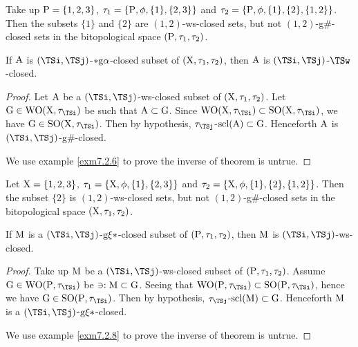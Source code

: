 \begin{exm}\label{exm7.2.4}
Take up $\mathrm{P}= \{1,2,3\}$, $\tau_1 =\{\mathrm{P}, \phi, \{1\}, \{2,3\}\}$ and $\tau_2 =\{\mathrm{P}, \phi, \{1\}, \{2\}, \{1,2\}\}$. Then the subsets $\{1\}$ and $\{2\}$ are $(1, 2)$-ws-closed sets, but not $(1, 2)$-g\#-closed sets in the bitopological space $(\mathrm{P}, \tau_1 , \tau_2 )$.
\end{exm}

\begin{thm}\label{thm7.2.5}
If $\mathrm{A}$ is $(\TSi, \TSj)$-$*\mathrm{g}\alpha$-closed subset of $(\mathrm{X}, \tau_1 , \tau_2)$, then $\mathrm{A}$ is $(\TSi, \TSj)$-$\TSw$-closed.
\end{thm}

\begin{proof}
Let $\mathrm{A}$ be a $(\TSi, \TSj)$-ws-closed subset of $(\mathrm{X}, \tau_1 , \tau_2)$. Let $\TSG\in\TSW\TSO(\TSX, \tau_{\TSi})$ be such that $\mathrm{A} \subset \mathrm{G}$. Since $\TSW\TSO(\TSX, \tau_{\TSi}) \subset \TSS\TSO(\TSX, \tau_{\TSi})$, we have $\TSG\in\TSS\TSO(\TSX, \tau_{\TSi})$. Then by hypothesis, $\tau_{\TSj}$-$\mathrm{scl}(\mathrm{A}) \subset \mathrm{G}$. Henceforth $\mathrm{A}$ is $(\TSi, \TSj)$-g\#-closed.

We use example \ref{exm7.2.6} to prove the inverse of theorem is untrue.
\end{proof}

\begin{exm}\label{exm7.2.6}
Let $\mathrm{X}= \{1, 2, 3\}$, $\tau_1 =\{\mathrm{X}, \phi, \{1\}, \{2,3\}\}$ and $\tau_2 =\{\mathrm{X}, \phi, \{1\}, \{2\}, \{1,2\}\}$. Then the subset $\{2\}$ is $(1, 2)$-ws-closed sets, but not $(1, 2)$-g\#-closed sets in the bitopological space $(\mathrm{X}, \tau_1 , \tau_2 )$.
\end{exm}

\begin{thm}\label{thm7.2.7}
If $\mathrm{M}$ is a $(\TSi, \TSj)$-$\mathrm{g}\xi*$-closed subset of $(\mathrm{P}, \tau_1, \tau_2)$, then $\mathrm{M}$ is $(\TSi, \TSj)$-ws-closed.
\end{thm}

\begin{proof}
Take up $\mathrm{M}$ be a $(\TSi, \TSj)$-ws-closed subset of $(\mathrm{P}, \tau_1 , \tau_2 )$. Assume $\TSG\in \TSW\TSO(\TSP, \tau_{\TSi})$ be $\ni: \mathrm{M} \subset
\mathrm{G}$. Seeing that $\TSW\TSO(\TSP, \tau_{\TSi}) \subset \TSS\TSO(\TSP, \tau_{\TSi})$, hence we have $\TSG\in\TSS\TSO(\TSP, \tau_{\TSi})$. Then by hypothesis, $\tau_{\TSj}$-$\mathrm{scl}(\mathrm{M}) \subset \mathrm{G}$. Henceforth $\mathrm{M}$ is a $(\TSi, \TSj)$-$\mathrm{g}\xi*$-closed.

We use example \ref{exm7.2.8} to prove the inverse of theorem is untrue.
\end{proof}


